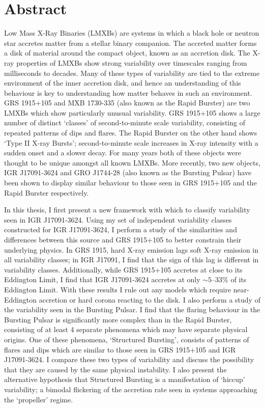 \chapter*{Abstract}

\par Low Mass X-Ray Binaries (LMXBs) are systems in which a black hole or neutron star accretes matter from a stellar binary companion.  The accreted matter forms a disk of material around the compact object, known as an accretion disk.  The X-ray properties of LMXBs show strong variability over timescales ranging from milliseconds to decades.  Many of these types of variability are tied to the extreme environment of the inner accretion disk, and hence an understanding of this behaviour is key to understanding how matter behaves in such an environment.  GRS 1915+105 and MXB 1730-335 (also known as the Rapid Burster) are two LMXBs which show particularly unusual variability.  GRS 1915+105 shows a large number of distinct `classes' of second-to-minute scale variability, consisting of repeated patterns of dips and flares.  The Rapid Burster on the other hand shows `Type II X-ray Bursts'; second-to-minute scale increases in X-ray intensity with a sudden onset and a slower decay.  For many years both of these objects were thought to be unique amongst all known LMXBs.  More recently, two new objects, IGR J17091-3624 and GRO J1744-28 (also known as the Bursting Pulsar) have been shown to display similar behaviour to those seen in GRS 1915+105 and the Rapid Burster respectively.

\par In this thesis, I first present a new framework with which to classify variability seen in IGR J17091-3624.  Using my set of independent variability classes constructed for IGR J17091-3624, I perform a study of the similarities and differences between this source and GRS 1915+105 to better constrain their underlying physics.  In GRS 1915, hard X-ray emission lags soft X-ray emission in all variability classes; in IGR J17091, I find that the sign of this lag is different in variability classes.  Additionally, while GRS 1915+105 accretes at close to its Eddington Limit, I find that IGR J17091-3624 accretes at only $\sim5$--33\% of its Eddington Limit.  With these results I rule out any models which require near-Eddington accretion or hard corona reacting to the disk.  I also perform a study of the variability seen in the Bursting Pulsar.  I find that the flaring behaviour in the Bursting Pulsar is significantly more complex than in the Rapid Burster, consisting of at least 4 separate phenomena which may have separate physical origins.  One of these phenomena, `Structured Bursting', consists of patterns of flares and dips which are similar to those seen in GRS 1915+105 and IGR J17091-3624.  I compare these two types of variability and discuss the possibility that they are caused by the same physical instability.  I also present the alternative hypothesis that Structured Bursting is a manifestation of `hiccup' variability; a bimodal flickering of the accretion rate seen in systems approaching the `propeller' regime.